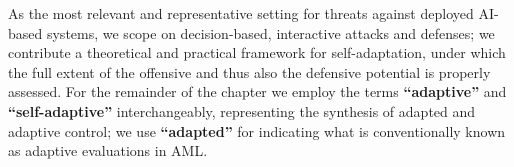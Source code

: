 As the most relevant and representative setting for threats against deployed AI-based systems, we scope on decision-based, interactive attacks and defenses; we contribute a theoretical and practical framework for self-adaptation, under which the full extent of the offensive and thus also the defensive potential is properly assessed.
For the remainder of the chapter we employ the terms \textbf{``adaptive''} and \textbf{``self-adaptive''} interchangeably, representing the synthesis of adapted and adaptive control; we use \textbf{``adapted''} for indicating what is conventionally known as adaptive evaluations in \gls{AML}.


